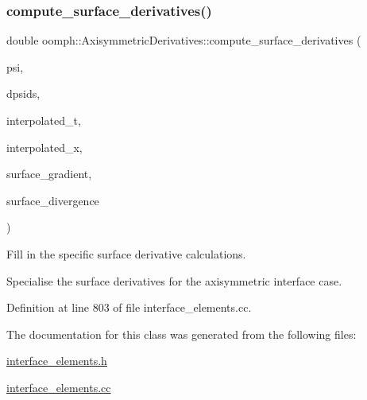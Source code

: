 \subsubsection{\texorpdfstring{compute\+\_\+surface\+\_\+derivatives()}{compute\_surface\_derivatives()}}
{\footnotesize\ttfamily double oomph\+::\+Axisymmetric\+Derivatives\+::compute\+\_\+surface\+\_\+derivatives (\begin{DoxyParamCaption}\item[{const Shape \&}]{psi,  }\item[{const D\+Shape \&}]{dpsids,  }\item[{const Dense\+Matrix$<$ double $>$ \&}]{interpolated\+\_\+t,  }\item[{const Vector$<$ double $>$ \&}]{interpolated\+\_\+x,  }\item[{D\+Shape \&}]{surface\+\_\+gradient,  }\item[{D\+Shape \&}]{surface\+\_\+divergence }\end{DoxyParamCaption})\hspace{0.3cm}{\ttfamily [protected]}}



Fill in the specific surface derivative calculations. 

Specialise the surface derivatives for the axisymmetric interface case. 

Definition at line 803 of file interface\+\_\+elements.\+cc.



The documentation for this class was generated from the following files\+:\begin{DoxyCompactItemize}
\item 
\hyperlink{interface__elements_8h}{interface\+\_\+elements.\+h}\item 
\hyperlink{interface__elements_8cc}{interface\+\_\+elements.\+cc}\end{DoxyCompactItemize}
